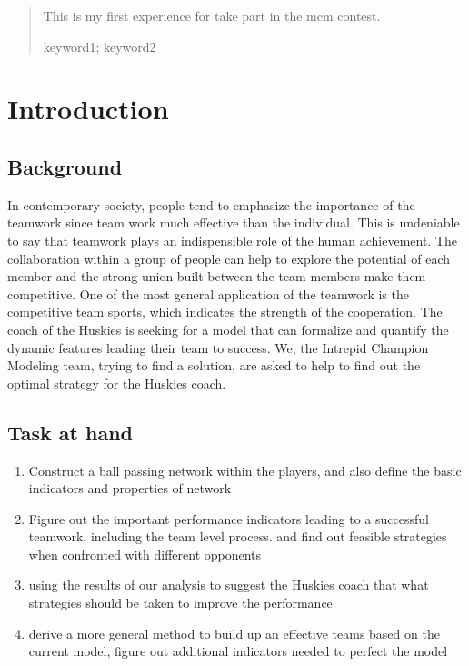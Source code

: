 \documentclass{mcmthesis}
\begin{document}
\begin{abstract}
This is my first experience for take part in the mcm contest. 

\begin{keywords}
keyword1; keyword2
\end{keywords}
\end{abstract}
\maketitle
\tableofcontents
\newpage

\memodate{\today}
\begin{memo}[Memorandum]
\lipsum[1-3]
\end{memo}
\section{Introduction}
\subsection{Background}
In contemporary society, people tend to emphasize the
importance of the teamwork since team work much effective
than the individual. This is undeniable to say that teamwork 
plays an indispensible role of the human achievement.
The collaboration within a group of people can help to explore the 
potential of each member and the strong union built between the team members 
make them competitive. One of the most general application of the teamwork 
is the competitive team sports, which indicates the strength of the cooperation.
The coach of the Huskies is seeking for a model that can 
formalize and quantify the dynamic features leading their 
team to success. We, the Intrepid Champion Modeling team,
trying to find a solution, are asked to help to find out the
optimal strategy for the Huskies coach.  

\subsection{Task at hand}
\begin{enumerate}
  \item Construct a ball passing network within the players,
  and also define the basic indicators and properties of network
  \item Figure out the important performance indicators leading to a
  successful teamwork, including the team level process. and find out 
  feasible strategies when confronted with different opponents
  \item using the results of our analysis to suggest the Huskies coach
  that what strategies should be taken to improve the performance 
  \item derive a more general method to build up an effective teams based
  on the current model, figure out additional indicators needed to 
  perfect the model
     
\end{enumerate}
\end{document}
